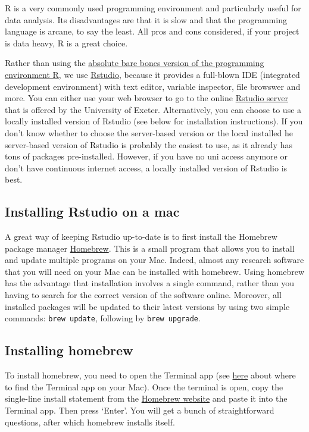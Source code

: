 \documentclass[
]{book}
\begin{document}
R is a very commonly used programming environment and particularly useful for data analysis. Its disadvantages are that it is slow and that the programming language is arcane, to say the least. All pros and cons considered, if your project is data heavy, R is a great choice.

Rather than using the \href{https://cran.r-project.org/}{absolute bare bones version of the programming environment R}, we use \href{https://www.rstudio.com/}{Rstudio}, because it provides a full-blown IDE (integrated development environment) with text editor, variable inspector, file browswer and more. You can either use your web browser to go to the online \href{https://rstudio01.cles.ex.ac.uk}{Rstudio server} that is offered by the University of Exeter. Alternatively, you can choose to use a locally installed version of Rstudio (see below for installation instructions). If you don't know whether to choose the server-based version or the local installed he server-based version of Rstudio is probably the easiest to use, as it already has tons of packages pre-installed. However, if you have no uni access anymore or don't have continuous internet access, a locally installed version of Rstudio is best.

\hypertarget{installing-rstudio-on-a-mac}{%
\subsection{Installing Rstudio on a mac}\label{installing-rstudio-on-a-mac}}

A great way of keeping Rstudio up-to-date is to first install the Homebrew package manager
\href{https://brew.sh}{Homebrew}. This is a small program that allows you to install and update multiple programs on your Mac. Indeed, almost any research software that you will need on your Mac can be installed with homebrew. Using homebrew has the advantage that installation involves a single command, rather than you having to search for the correct version of the software online. Moreover, all installed packages will be updated to their latest versions by using two simple commands: \texttt{brew\ update}, following by \texttt{brew\ upgrade}.

\hypertarget{installing-homebrew}{%
\subsection{Installing homebrew}\label{installing-homebrew}}

To install homebrew, you need to open the Terminal app (see \protect\hyperlink{MacTerminal}{here} about where to find the Terminal app on your Mac). Once the terminal is open, copy the single-line install statement from the \href{https://brew.sh/}{Homebrew website} and paste it into the Terminal app. Then press `Enter'. You will get a bunch of straightforward questions, after which homebrew installs itself.
\end{document}
